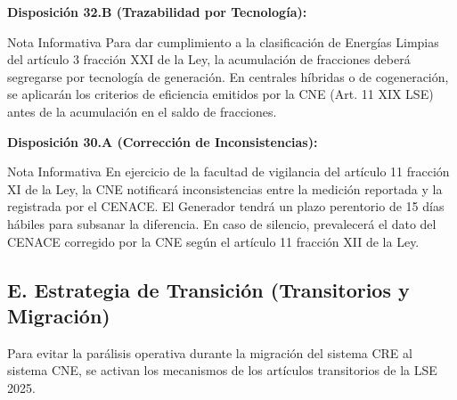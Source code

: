 \documentclass{cel}
\begin{document}
\textbf{Disposición 32.B (Trazabilidad por Tecnología):}


\vspace{0.2cm}
\begin{glowBox}[gobmxDorado]{Nota Informativa}
\textquotedbl{}Para dar cumplimiento a la clasificación de Energías Limpias del artículo 3 fracción XXI de la Ley, la acumulación de fracciones deberá segregarse por tecnología de generación. En centrales híbridas o de cogeneración, se aplicarán los criterios de eficiencia emitidos por la CNE (Art. 11 XIX LSE) antes de la acumulación en el saldo de fracciones.\textquotedbl{}
\end{glowBox}

\textbf{Disposición 30.A (Corrección de Inconsistencias):}


\vspace{0.2cm}
\begin{glowBox}[gobmxDorado]{Nota Informativa}
\textquotedbl{}En ejercicio de la facultad de vigilancia del artículo 11 fracción XI de la Ley, la CNE notificará inconsistencias entre la medición reportada y la registrada por el CENACE. El Generador tendrá un plazo perentorio de 15 días hábiles para subsanar la diferencia. En caso de silencio, prevalecerá el dato del CENACE corregido por la CNE según el artículo 11 fracción XII de la Ley.\textquotedbl{}
\end{glowBox}

\subsection{E. Estrategia de Transición (Transitorios y Migración)}
\nopagebreak

Para evitar la parálisis operativa durante la migración del sistema CRE al sistema CNE, se activan los mecanismos de los artículos transitorios de la LSE 2025.
\end{document}
